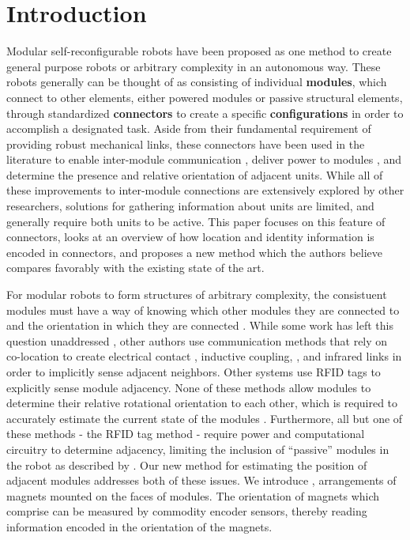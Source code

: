 \section{Introduction}
\label{sec:Introduction}

Modular self-reconfigurable robots have been proposed as one method to create general purpose robots or arbitrary complexity in an autonomous way. These robots generally can be thought of as consisting of individual \textbf{modules}, which connect to other elements, either powered modules or passive structural elements, through standardized \textbf{connectors} to create a specific \textbf{configurations} in order to accomplish a designated task. Aside from their fundamental requirement of providing robust mechanical links, these connectors have been used in the literature to enable inter-module communication \cite{liedke2013collective} \cite{TosunDaveyLiuYim-IROS2016}, deliver power to modules \cite{todo} \cite{todo}, and determine the presence and relative orientation of adjacent units. While all of these improvements to inter-module connections are extensively explored by other researchers, solutions for gathering information about units are limited, and generally require both units to be active.  This paper focuses on this feature of connectors, looks at an overview of how location and identity information is encoded in connectors, and proposes a new method which the authors believe compares favorably with the existing state of the art.

For modular robots to form structures of arbitrary complexity, the consistuent modules must have a way of knowing which other modules they are connected to and the orientation in which they are connected \cite{todo!}. While some work has left this question unaddressed \cite{todo}, other authors use communication methods that rely on co-location to create electrical contact \cite{liedke2013collective}, inductive coupling, \cite{Gilpin-Thesis06} \cite{TosunDaveyLiuYim-IROS2016}, and infrared links in order to implicitly sense adjacent neighbors.  Other systems use RFID tags \cite{Werfel-PhDThesis06} to explicitly sense module adjacency.  None of these methods allow modules to determine their relative rotational orientation to each other, which is required to accurately estimate the current state of the modules \cite{todo?}.  Furthermore, all but one of these methods - the RFID tag method - require power and computational circuitry to determine adjacency, limiting the inclusion of ``passive'' modules in the robot as described by \cite{roombots5}.  Our new method for estimating the position of adjacent modules addresses both of these issues.  We introduce \tagNamePlural, arrangements of magnets mounted on the faces of modules.  The orientation of magnets which comprise \tagNamePlural can be measured by commodity encoder sensors, thereby reading information encoded in the orientation of the magnets.

